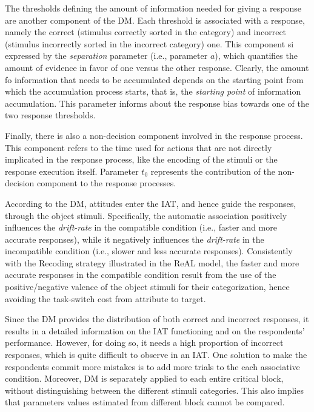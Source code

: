 \documentclass[12pt]{book}
\begin{document}
The thresholds defining the amount of information needed for giving a response are another component of the DM. Each threshold is associated with a response, namely the correct (stimulus correctly sorted in the category) and incorrect (stimulus incorrectly sorted in the incorrect category) one. This component si expressed by the \emph{separation} parameter (i.e., parameter $a$), which quantifies the amount of evidence in favor of one versus the other response. Clearly, the amount fo information that needs to be accumulated depends on the starting point from which the accumulation process starts, that is, the \emph{starting point} of information accumulation. This parameter informs about the response bias towards one of the two response thresholds. 

Finally, there is also a non-decision component involved in the response process. This component refers to the time used for actions that are not directly implicated in the response process, like the encoding of the stimuli or the response execution itself. Parameter $t_0$ represents the contribution of the non-decision component to the response processes. 

According to the DM, attitudes enter the IAT, and hence guide the responses, through the object stimuli. Specifically, the automatic association positively influences the \emph{drift-rate} in the compatible condition (i.e., faster and more accurate responses), while it negatively influences the \emph{drift-rate} in the incompatible condition (i.e., slower and less accurate responses). Consistently with the Recoding strategy illustrated in the ReAL model, the faster and more accurate responses in the compatible condition result from the use of the positive/negative valence of the object stimuli for their categorization, hence avoiding the task-switch cost from attribute to target. 

Since the DM provides the distribution of both correct and incorrect responses, it results in a detailed information on the IAT functioning and on the respondents' performance. However, for doing so, it needs a high proportion of incorrect responses, which is quite difficult to observe in an IAT. One solution to make the respondents commit more mistakes is to add more trials to the each associative condition. Moreover, DM is separately applied to each entire critical block, without distinguishing between the different stimuli categories. This also implies that parameters values estimated from different block cannot be compared. 
 
\end{document}
